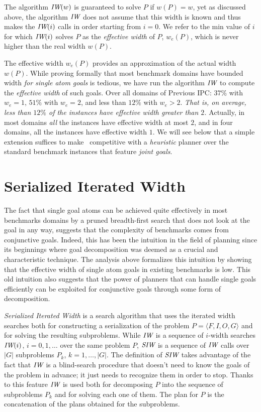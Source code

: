 \documentclass[letterpaper]{article}
\begin{document}
The  algorithm ${\textit{IW}}(w)$ is guaranteed to solve $P$ if $w(P)=w$,
yet as discussed above, the algorithm ${\textit{IW}}$ does not assume
that this width is known  and thus makes the ${\textit{IW}}(i)$ calls in order
starting from $i=0$. We  refer to the min value of $i$
for which ${\textit{IW}}(i)$ solves $P$ as the \emph{effective width} of $P$,
$w_e(P)$, which is never higher than the real width $w(P)$.



The effective width $w_e(P)$ provides an approximation of the actual
width $w(P)$.  While proving formally that most benchmark domains have
bounded width \emph{for single atom goals} is tedious, we have run the
algorithm ${\textit{IW}}$ to compute the \emph{effective width} of such
goals. Over all domains of Previous IPC: $37\%$ with $w_e=1$, $51\%$
with $w_e=2$, and less than $12\%$ with $w_e > 2$. \emph{That is, on
  average, less than $12\%$ of the instances have effective width
  greater than $2$.}  Actually, in most domains \emph{all} the
instances have effective width at most $2$, and in four domains, all
the instances have effective width $1$. We will see below that a
simple extension suffices to make \IR\ competitive with a
\emph{heuristic} planner over the standard benchmark instances that
feature \emph{joint goals}.

\section{Serialized Iterated Width}


The fact that single goal atoms can be achieved quite effectively in
most benchmarks domains by a pruned breadth-first search that does not
look at the goal in any way, suggests that the complexity of
benchmarks comes from conjunctive goals. Indeed, this has been the
intuition in the field of planning since its beginnings where goal
decomposition was deemed as a crucial and characteristic
technique. The analysis above formalizes this intuition by showing
that the effective width of single atom goals in existing benchmarks
is low.  This old intuition also suggests that the power of planners
that can handle single goals efficiently can be exploited for
conjunctive goals through some form of decomposition.


\emph{Serialized Iterated Width} is a search algorithm that uses the
iterated width searches both for constructing a serialization of the
problem $P = \langle F,I,O,G\rangle$ and for solving the resulting
subproblems. While ${\textit{IW}}$ is a sequence of $i$-width searches ${\textit{IW}}(i)$,
$i=0,1,\ldots$ over the same problem $P$, ${\textit{SIW}}$ is a sequence of ${\textit{IW}}$
calls over $|G|$ subproblems $P_k$, $k=1, \ldots, |G|$.  The
definition of ${\textit{SIW}}$ takes advantage of the fact that ${\textit{IW}}$ is a
blind-search procedure that doesn't need to know the goals of the
problem in advance; it just needs to recognize them in order to stop.
Thanks to this feature ${\textit{IW}}$ is used both for decomposing $P$ into the
sequence of subproblems $P_k$ and for solving each one of them. The
plan for $P$ is the concatenation of the plans obtained for the
subproblems.
\end{document}
